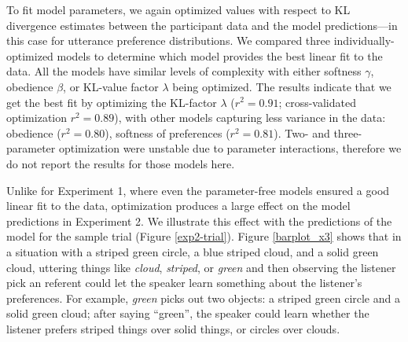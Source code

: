 \documentclass[10pt,a4paper]{article}
\begin{document}


To fit model parameters, we again optimized values with respect to KL divergence estimates between the participant data and the model predictions---in this case for utterance preference distributions.  We compared three individually-optimized models to determine which model provides the best linear fit to the data. All the models have similar levels of complexity with either softness $\gamma$, obedience $\beta$, or KL-value factor $\lambda$ being optimized. The results indicate that we get the best fit by optimizing the KL-factor $\lambda$ ($r^{2}=0.91$; cross-validated optimization $r^{2}=0.89$), with other models capturing less variance in the data: obedience ($r^{2}=0.80$), softness of preferences ($r^{2}=0.81$). Two- and three-parameter optimization were unstable due to parameter interactions, therefore we do not report the results for those models here.

Unlike for Experiment 1, where even the parameter-free models ensured a good linear fit to the data, optimization produces a large effect on the model predictions in Experiment 2. We illustrate this effect with the predictions of the model for the sample trial (Figure \ref{exp2-trial}). Figure \ref{barplot_x3} shows that in a situation with a  striped green circle, a blue striped cloud, and a solid green  cloud, uttering things like \textit{cloud}, \textit{striped}, or \textit{green} and then observing the listener pick an referent could let the speaker learn something about the listener's preferences. For example, \textit{green} picks out two objects: a striped green circle and a solid green cloud; after saying ``green'', the speaker could learn whether the listener prefers striped things over solid things, or circles over clouds.
\end{document}
